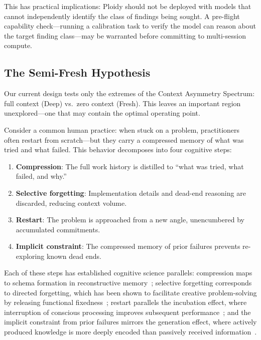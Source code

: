 \documentclass[11pt]{article}
\begin{document}
This has practical implications: Ploidy should not be deployed with models that cannot independently identify the class of findings being sought. A pre-flight capability check---running a calibration task to verify the model can reason about the target finding class---may be warranted before committing to multi-session compute.

\subsection{The Semi-Fresh Hypothesis}
\label{sec:semifresh}

Our current design tests only the extremes of the Context Asymmetry Spectrum: full context (Deep) vs.\ zero context (Fresh). This leaves an important region unexplored---one that may contain the optimal operating point.

Consider a common human practice: when stuck on a problem, practitioners often restart from scratch---but they carry a compressed memory of what was tried and what failed. This behavior decomposes into four cognitive steps:

\begin{enumerate}[label=\arabic*., leftmargin=1.5em]
  \item \textbf{Compression}: The full work history is distilled to ``what was tried, what failed, and why.''
  \item \textbf{Selective forgetting}: Implementation details and dead-end reasoning are discarded, reducing context volume.
  \item \textbf{Restart}: The problem is approached from a new angle, unencumbered by accumulated commitments.
  \item \textbf{Implicit constraint}: The compressed memory of prior failures prevents re-exploring known dead ends.
\end{enumerate}

Each of these steps has established cognitive science parallels: compression maps to schema formation in reconstructive memory~\citep{bartlett1932remembering}; selective forgetting corresponds to directed forgetting, which has been shown to facilitate creative problem-solving by releasing functional fixedness~\citep{storm2012forgetting}; restart parallels the incubation effect, where interruption of conscious processing improves subsequent performance~\citep{sio2009incubation}; and the implicit constraint from prior failures mirrors the generation effect, where actively produced knowledge is more deeply encoded than passively received information~\citep{slamecka1978generation}.
\end{document}
